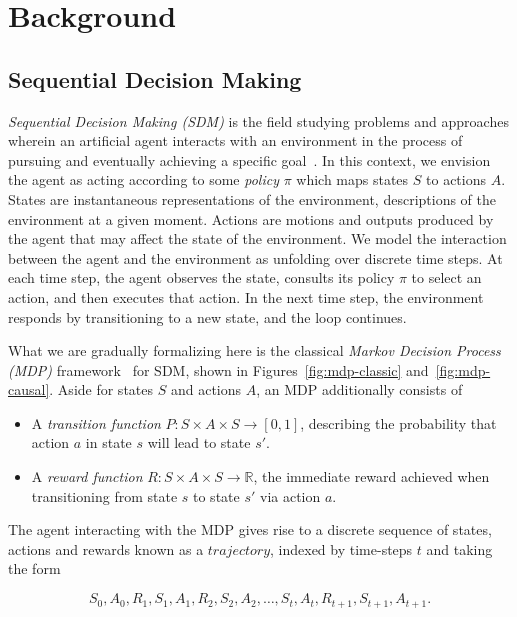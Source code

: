 \documentclass[../main.tex]{subfiles}
\begin{document}
\chapter{Background}\label{back:chap}
\section{Sequential Decision Making}

\emph{Sequential Decision Making (SDM)} is the field studying problems and approaches wherein an
artificial agent interacts with an environment in the process of pursuing and eventually achieving
a specific goal~\citep{frankish_cambridge_2014}. In this context, we envision the agent as acting
according to some \emph{policy} $\pi$ which maps states $S$ to actions $A$. States are instantaneous
representations of the environment, descriptions of the environment at a given moment. Actions are
motions and outputs produced by the agent that may affect the state of the environment. We model the
interaction between the agent and the environment as unfolding over discrete time steps. At each
time step, the agent observes the state, consults its policy $\pi$ to select an action, and then
executes that action. In the next time step, the environment responds by transitioning to a new
state, and the loop continues.

What we are gradually formalizing here is the classical \emph{Markov Decision Process (MDP)}
framework~\citep{puterman_markov_2014} for SDM, shown in Figures~\ref{fig:mdp-classic}
and~\ref{fig:mdp-causal}. Aside for states $S$ and actions $A$, an MDP additionally consists of

\begin{itemize}
	\item A \emph{transition function} $P : S \times A \times S \rightarrow [0, 1]$, describing the
	      probability that action $a$ in state $s$ will lead to state $s'$.
	\item A \emph{reward function} $R : S \times A \times S \rightarrow \mathbb{R}$, the immediate reward
	      achieved when transitioning from state $s$ to state $s'$ via action $a$.
\end{itemize}

The agent interacting with the MDP gives rise to a discrete sequence of states, actions and rewards
known as a $trajectory$, indexed by time-steps $t$ and taking the form

\begin{equation*}
	S_0, A_0, R_1, S_1, A_1, R_2, S_2, A_2, \dots, S_t, A_t, R_{t+1}, S_{t+1}, A_{t+1}.
\end{equation*}
\end{document}
